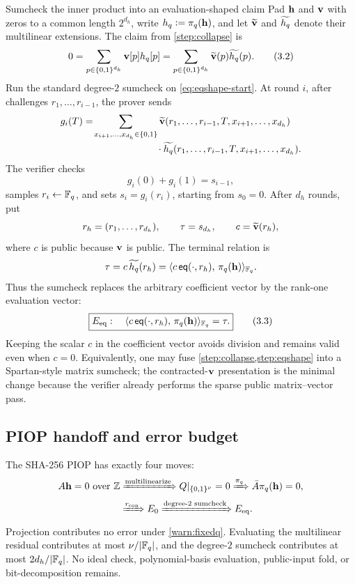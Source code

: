 \begin{step}{Sumcheck the inner product into an evaluation-shaped claim}{%
}\label{step:eqshape}
Pad $\mathbf{h}$ and $\mathbf{v}$ with zeros to a common length $2^{d_h}$, write
$h_q\vcentcolon=\pi_q(\mathbf{h})$, and let $\widetilde{\mathbf{v}}$ and $\widetilde{h_q}$ denote their
multilinear extensions.  The claim from \cref{step:collapse} is
\[
  0
  =\sum_{p\in\{0,1\}^{d_h}}\mathbf{v}[p]h_q[p]
  =\sum_{p\in\{0,1\}^{d_h}}\widetilde{\mathbf{v}}(p)\widetilde{h_q}(p).    \tag{3.2}\label{eq:eqshape-start}
\]
Run the standard degree-$2$ sumcheck on \eqref{eq:eqshape-start}.  At round
$i$, after challenges $r_1,\ldots,r_{i-1}$, the prover sends
\[
\begin{aligned}
  g_i(T)
  ={}&\!\!\sum_{x_{i+1},\ldots,x_{d_h}\in\{0,1\}}
    \widetilde{\mathbf{v}}(r_1,\ldots,r_{i-1},T,x_{i+1},\ldots,x_{d_h})\\[-2pt]
   &\hspace{2.2cm}\cdot
    \widetilde{h_q}(r_1,\ldots,r_{i-1},T,x_{i+1},\ldots,x_{d_h}).
\end{aligned}
\]
The verifier checks
\[
  g_i(0)+g_i(1)=s_{i-1},
\]
samples $r_i\leftarrow\mathbb{F}_q$, and sets $s_i=g_i(r_i)$, starting from
$s_0=0$.  After $d_h$ rounds, put
\[
  r_h=(r_1,\ldots,r_{d_h}),
  \qquad \tau=s_{d_h},
  \qquad c=\widetilde{\mathbf{v}}(r_h),
\]
where $c$ is public because $\mathbf{v}$ is public.  The terminal relation is
\[
  \tau=c\,\widetilde{h_q}(r_h)
      =\langle c\,\mathsf{eq}(\cdot,r_h),\, \pi_q(\mathbf{h})\rangle_{\mathbb{F}_q}.
\]
Thus the sumcheck replaces the arbitrary coefficient vector by the rank-one
evaluation vector:
\[
  \boxed{
  E_{\rm eq}:\quad
  \langle c\,\mathsf{eq}(\cdot,r_h),\, \pi_q(\mathbf{h})\rangle_{\mathbb{F}_q}=\tau.}         \tag{3.3}\label{eq:eqshape-end}
\]
Keeping the scalar $c$ in the coefficient vector avoids division and remains
valid even when $c=0$.  Equivalently, one may fuse
\cref{step:collapse,step:eqshape} into a Spartan-style matrix sumcheck; the
contracted-$\mathbf{v}$ presentation is the minimal change because the verifier
already performs the sparse public matrix--vector pass.

\end{step}

\subsection{PIOP handoff and error budget}

The SHA-256 PIOP has exactly four moves:
\[
  \begin{aligned}
  A\mathbf{h}=0\text{ over }\mathbb{Z}
  &\xRightarrow{\text{multilinearize}}
    Q|_{\{0,1\}^{\nu}}=0
   \xRightarrow{\pi_q}
    \bar A\pi_q(\mathbf{h})=0,\\
  &\xRightarrow{r_{\mathrm{con}}}
    E_0
   \xRightarrow{\text{degree-2 sumcheck}}
    E_{\rm eq}.
  \end{aligned}
\]
Projection contributes no error under \cref{warn:fixedq}.  Evaluating the
multilinear residual contributes at most $\nu/|\mathbb{F}_q|$, and the degree-$2$
sumcheck contributes at most $2d_h/|\mathbb{F}_q|$.  No ideal check,
polynomial-basis evaluation, public-input fold, or bit-decomposition remains.
